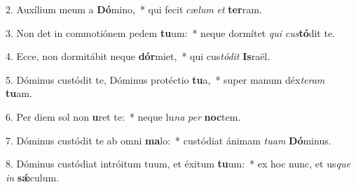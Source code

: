 2. Auxílium meum a \textbf{Dó}mino,~*  qui fecit cæ\textit{lum} \textit{et} \textbf{ter}ram.\

3. Non det in commotiónem pedem \textbf{tu}um:~*  neque dormítet \textit{qui} \textit{cus}\textbf{tó}dit te.\

4. Ecce, non dormitábit neque \textbf{dór}miet,~*  qui cus\textit{tó}\textit{dit} \textbf{Is}raël.\

5. Dóminus custódit te, Dóminus protéctio \textbf{tu}a,~*  super manum déx\textit{te}\textit{ram} \textbf{tu}am.\

6. Per diem sol non \textbf{u}ret te:~*  neque lu\textit{na} \textit{per} \textbf{noc}tem.\

7. Dóminus custódit te ab omni \textbf{ma}lo:~*  custódiat ánimam \textit{tu}\textit{am} \textbf{Dó}minus.\

8. Dóminus custódiat intróitum tuum, et éxitum \textbf{tu}um:~*  ex hoc nunc, et us\textit{que} \textit{in} \textbf{sǽ}culum.\


